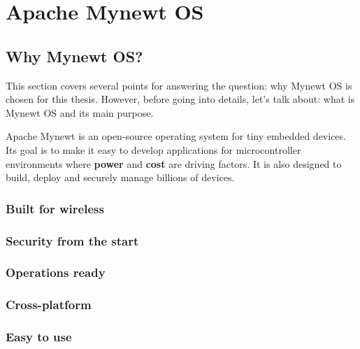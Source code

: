 \documentclass[\main/main.tex]{subfiles}
\begin{document}
\graphicspath{{img/}{03_firmware/img/}}

\chapter{Apache Mynewt OS}

\section{Why Mynewt OS?}
This section covers several points for answering the question: why Mynewt OS is chosen for this thesis. However, before going into details, let's talk about: what is Mynewt OS and its main purpose.

Apache Mynewt is an open-source operating system for tiny embedded devices. Its goal is to make it easy to develop applications for microcontroller environments where \textbf{power} and \textbf{cost} are driving factors. It is also designed to build, deploy and securely manage billions of devices.

\subsection{Built for wireless}

\subsection{Security from the start}

\subsection{Operations ready}

\subsection{Cross-platform}

\subsection{Easy to use}
\end{document}
